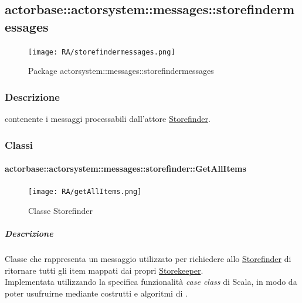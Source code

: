 \documentclass{scalatekids-article}
\begin{document}

\subsection{actorbase::actorsystem::messages::storefindermessages}
\label{sec:actorbase::actorsystem::messages::storefindermessages}

\begin{figure}[H]
  \begin{center}
    \texttt{[image: RA/storefindermessages.png]}
    \caption{Package actorsystem::messages::storefindermessages}
  \end{center}
\end{figure}

\subsubsection{Descrizione}
 contenente i messaggi processabili dall'attore \hyperref[sec:actorbase::actorsystem::actors::storefinder::Storefinder]{Storefinder}.

\subsubsection{Classi}

\paragraph{actorbase::actorsystem::messages::storefinder::GetAllItems}
\label{sec:actorbase::actorsystem::messages::storefinder::GetAllItems}

\begin{figure}[H]
  \begin{center}
    \texttt{[image: RA/getAllItems.png]}
    \caption{Classe Storefinder}
  \end{center}
\end{figure}

\subparagraph{Descrizione}
Classe che rappresenta un messaggio utilizzato per richiedere allo
\hyperref[sec:actorbase::actorsystem::actors::storefinder::Storefinder]{Storefinder} di ritornare tutti gli item mappati dai propri \hyperref[sec:actorbase::actorsystem::actors::storekeeper::Storekeeper]{Storekeeper}.\\Implementata utilizzando la specifica funzionalità \textit{case class} di Scala,
in modo da poter usufruirne mediante costrutti e algoritmi di
.
\end{document}
